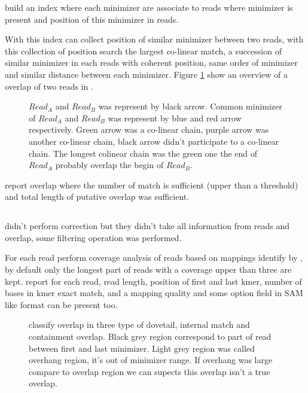 \documentclass[main]{subfiles}
\begin{document}
\minimap build an index where each minimizer are associate to reads where minimizer is present and position of this minimizer in reads.

With this index \minimap can collect position of similar minimizer between two reads, with this collection of position \minimap search the largest co-linear match, a succession of similar minimizer in each reads with coherent position, same order of minimizer and similar distance between each minimizer. Figure \ref{sota:fig:miniasm:mapping} show an overview of a overlap of two reads in \minimap.

\begin{figure}[ht]
    \centering
    
    \caption{$Read_A$ and $Read_B$ was represent by black arrow. Common minimizer of $Read_A$ and $Read_B$ was represent by blue and red arrow respectively. Green arrow was a co-linear chain, purple arrow was another co-linear chain, black arrow didn't participate to a co-linear chain. The longest colinear chain was the green one the end of $Read_A$ probably overlap the begin of $Read_B$.}
    \label{sota:fig:miniasm:mapping}
\end{figure}

\minimap report overlap where the number of match is sufficient (upper than a threshold) and  total length of putative overlap was sufficient. 

\subsection{\miniasm}

\miniasm didn't perform correction but they didn't take all information from reads and overlap, some filtering operation was performed.

For each read \miniasm perform coverage analysis of reads based on mappings identify by \minimap, by default only the longest part of reads with a coverage upper than three are kept. \minimap report for each read, read length, position of first and last kmer, number of bases in kmer exact match,  and a mapping quality and some option field in SAM like format can be present too.

\begin{figure}[ht]
    \centering
    
    \caption{\miniasm classify overlap in three type of dovetail, internal match and containment overlap. Black grey region correspond to part of read between first and last minimizer. Light grey region was called overhang region, it's out of minimizer range. If overhang was large compare to overlap region we can supects this overlap isn't a true overlap.}
    \label{sota:fig:miniasm:ovl_classification}
\end{figure}
\end{document}
